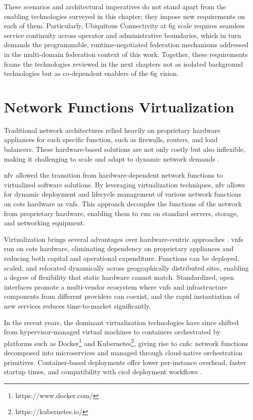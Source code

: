 These scenarios and architectural imperatives do not stand apart from the enabling technologies surveyed in this chapter; they impose new requirements on each of them. Particularly, Ubiquitous Connectivity at \ac{6g} scale requires seamless service continuity across operator and administrative boundaries, which in turn demands the programmable, runtime-negotiated federation mechanisms addressed in the multi-domain federation context of this work. Together, these requirements frame the technologies reviewed in the next chapters not as isolated background technologies but as co-dependent enablers of the \ac{6g} vision.

\section{Network Functions Virtualization}

Traditional network architectures relied heavily on proprietary hardware appliances for each specific function, such as firewalls, routers, and load balancers. These hardware-based solutions are not only costly but also inflexible, making it challenging to scale and adapt to dynamic network demands \cite{ChiosiNetworkFunctionsVirtualisationIntroductionBenefits}. 

\ac{nfv} allowed the transition from hardware-dependent network functions to virtualized software solutions. By leveraging virtualization techniques, \ac{nfv} allows for dynamic deployment and lifecycle management of various network functions on \ac{cots} hardware as \acp{vnf}. This approach decouples the functions of the network from proprietary hardware, enabling them to run on standard servers, storage, and networking equipment.

Virtualization brings several advantages over hardware-centric approaches \cite{ETSINetworkFunctionsVirtualisationNFVArchitectural2014}. \acp{vnf} run on \ac{cots} hardware, eliminating dependency on proprietary appliances and reducing both capital and operational expenditure. Functions can be deployed, scaled, and relocated dynamically across geographically distributed sites, enabling a degree of flexibility that static hardware cannot match. Standardized, open interfaces promote a multi-vendor ecosystem where \acp{vnf} and infrastructure components from different providers can coexist, and the rapid instantiation of new services reduces time-to-market significantly.

In the recent years, the dominant virtualization technologies have since shifted from hypervisor-managed virtual machines to containers orchestrated by platforms such as Docker\footnote{https://www.docker.com/} and Kubernetes\footnote{https://kubernetes.io/}, giving rise to \acp{cnf}: network functions decomposed into microservices and managed through cloud-native orchestration primitives. Container-based deployments offer lower per-instance overhead, faster startup times, and compatibility with \ac{cicd} deployment workflows \cite{ValantasisExperimentalEvaluationOrchestrationSoftwareVirtual2021}.

